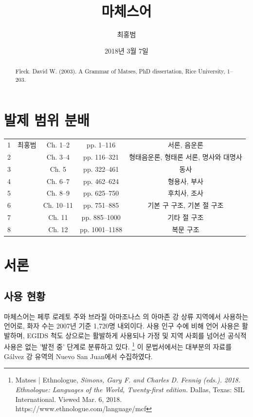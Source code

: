 
\date{2018년 3월 7일}

\begin{frontmatter}
\title{마체스어}
\author{최홍범}
\begin{abstract}
Fleck. David W. (2003). A Grammar of Matses, PhD dissertation, Rice University, 1--203.
\end{abstract}
\end{frontmatter}


\section*{발제 범위 분배}
\begin{center}
\begin{tabular}{ccccc}
\hline
1 &최홍범	& Ch. 1--2 	& pp. 1--116 		& 서론, 음운론 \\
2 & 			& Ch. 3--4	& pp. 116--321	& 형태음운론, 형태론 서론, 명사와 대명사 \\
3 &			& Ch. 5		& pp. 322--461	& 동사 \\
4 &			& Ch. 6--7	& pp. 462--624	& 형용사, 부사 \\
5 &			& Ch. 8--9	& pp. 625--750	& 후치사, 조사 \\
6 & 			& Ch. 10--11	& pp. 751--885	& 기본 구 구조, 기본 절 구조 \\
7 &			& Ch. 11		& pp. 885--1000	& 기타 절 구조 \\
8 &			& Ch. 12		& pp. 1001--1188	& 복문 구조 \\
\hline
\end{tabular}
\end{center}

\section{서론}
\subsection{사용 현황}
마체스어는 페루 로레토 주와 브라질 아마조나스 의 아마존 강 상류 지역에서 사용하는 언어로, 화자 수는 2007년 기준 1,720명 내외이다. 사용 인구 수에 비해 언어 사용은 활발하며, EGIDS 척도 상으로는 활발하게 사용되나 가정 및 지역 사회를 넘어선 공식적 사용은 없는 '발전 중' 단계로 분류하고 있다. 
\footnote{Matses | Ethnologue, \textit{Simons, Gary F. and Charles D. Fennig (eds.). 2018. Ethnologue: Languages of the World, Twenty-first edition. }Dallas, Texas: SIL International. Viewed Mar. 6, 2018. https://www.ethnologue.com/language/mcf} 
이 문법서에서는 대부분의 자료를 Gálvez 강 유역의 Nuevo San Juan에서 수집하였다. 

